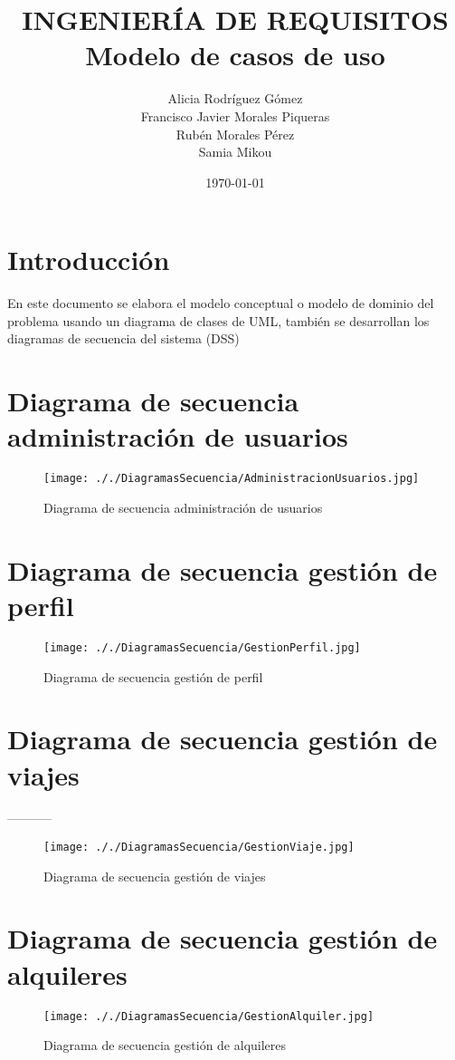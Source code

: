 \documentclass[11pt,spanish]{article} %
\title{INGENIERÍA DE REQUISITOS \\
	Modelo de casos de uso}
\author{Alicia Rodríguez Gómez \\
	Francisco Javier Morales Piqueras \\
	Rubén Morales Pérez \\
	Samia Mikou}
\date{\today}
\begin{document}
\maketitle
\tableofcontents %
\setlength\parindent{0pt} %
\newpage 

\vspace{5cm}
\section{Introducción}
En este documento se elabora el modelo conceptual o modelo de dominio del problema usando un diagrama de clases de UML, también se desarrollan los diagramas de secuencia del sistema (DSS)


\section{Diagrama de secuencia administración de usuarios}
\begin{figure}[H]
	\centering
	\label{AdministracionUsuarios}
	\texttt{[image: ././DiagramasSecuencia/AdministracionUsuarios.jpg]}
	\caption{Diagrama de secuencia administración de usuarios}
\end{figure}

\section{Diagrama de secuencia gestión de perfil}
\begin{figure}[H]
	\centering
	\label{GestionPerfil}
	\texttt{[image: ././DiagramasSecuencia/GestionPerfil.jpg]}
	\caption{Diagrama de secuencia gestión de perfil}
\end{figure}


\section{Diagrama de secuencia gestión de viajes} -----------
\begin{figure}[H]
	\centering
	\label{GestionViaje}
	\texttt{[image: ././DiagramasSecuencia/GestionViaje.jpg]}
	\caption{Diagrama de secuencia gestión de viajes}
\end{figure}

\section{Diagrama de secuencia gestión de alquileres}
\begin{figure}[H]
	\centering
	\label{GestionAlquileres}
	\texttt{[image: ././DiagramasSecuencia/GestionAlquiler.jpg]}
	\caption{Diagrama de secuencia gestión de alquileres}
\end{figure}
\end{document}
